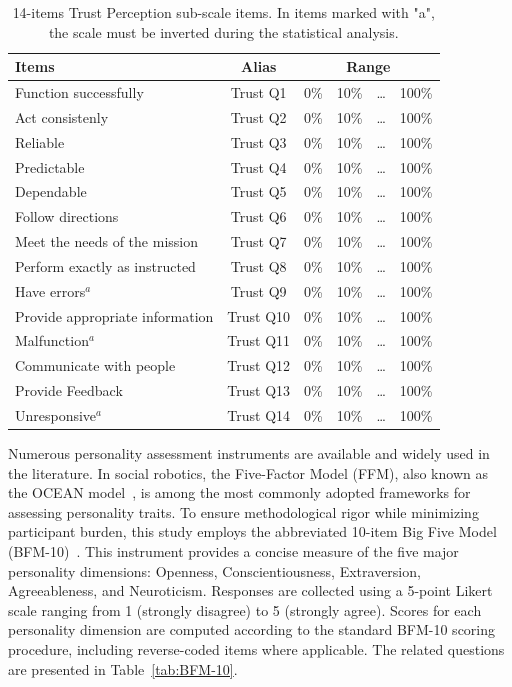 \begin{table}[]
    \centering
    \begin{tabular}{l|c|c|c|c|c}
         \textbf{Items} & \textbf{Alias} & \multicolumn{4}{c|}{\textbf{Range}} \\
         \hline
         Function successfully& Trust Q1 & 0\% & 10\% & \dots & 100\% \\
         Act consistenly & Trust Q2 & 0\% & 10\% & \dots & 100\% \\
         Reliable & Trust Q3 & 0\% & 10\% & \dots & 100\% \\
         Predictable & Trust Q4 & 0\% & 10\% & \dots & 100\% \\
         Dependable & Trust Q5 & 0\% & 10\% & \dots & 100\% \\
         Follow directions & Trust Q6 & 0\% & 10\% & \dots & 100\% \\
         Meet the needs of the mission & Trust Q7 & 0\% & 10\% & \dots & 100\% \\
         Perform exactly as instructed & Trust Q8 & 0\% & 10\% & \dots & 100\% \\
         Have errors$^a$ & Trust Q9 & 0\% & 10\% & \dots & 100\% \\
         Provide appropriate information & Trust Q10 & 0\% & 10\% & \dots & 100\% \\
         Malfunction$^a$ & Trust Q11 & 0\% & 10\% & \dots & 100\% \\
         Communicate with people & Trust Q12 & 0\% & 10\% & \dots & 100\% \\
         Provide Feedback & Trust Q13 & 0\% & 10\% & \dots & 100\% \\
         Unresponsive$^a$ & Trust Q14 & 0\% & 10\% & \dots & 100\% \\
    \end{tabular}
    \caption{14-items Trust Perception sub-scale items. In items marked with "a", the scale must be inverted during the statistical analysis.}
    \label{tab:trust-scale}
\end{table}

Numerous personality assessment instruments are available and widely used in the literature. In social robotics, the Five-Factor Model (FFM), also known as the OCEAN model~\citep{goldberg1981language}, is among the most commonly adopted frameworks for assessing personality traits. To ensure methodological rigor while minimizing participant burden, this study employs the abbreviated 10-item Big Five Model (BFM-10)~\citep{rammstedt2007measuring}. This instrument provides a concise measure of the five major personality dimensions: Openness, Conscientiousness, Extraversion, Agreeableness, and Neuroticism. Responses are collected using a 5-point Likert scale ranging from 1 (strongly disagree) to 5 (strongly agree). Scores for each personality dimension are computed according to the standard BFM-10 scoring procedure, including reverse-coded items where applicable. The related questions are presented in Table~\ref{tab:BFM-10}.

